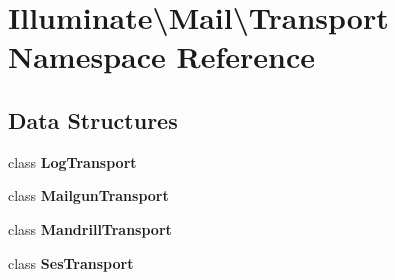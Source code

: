 \section{Illuminate\textbackslash{}Mail\textbackslash{}Transport Namespace Reference}
\label{namespace_illuminate_1_1_mail_1_1_transport}
\subsection*{Data Structures}
\begin{DoxyCompactItemize}
\item 
class {\bf Log\+Transport}
\item 
class {\bf Mailgun\+Transport}
\item 
class {\bf Mandrill\+Transport}
\item 
class {\bf Ses\+Transport}
\end{DoxyCompactItemize}
